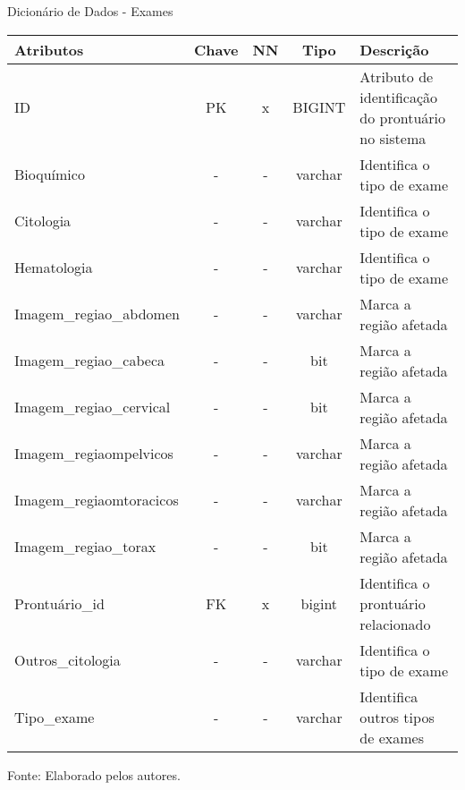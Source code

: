 \documentclass[
    12pt,               %
    openright,          %
    oneside,
    a4paper,            %
    BIBLATEX,           %
    TODO,               %
    english,            %
    brazil              %
    ]{ifsp-spo-inf-ctds}
\begin{document}
\begin{center}
                \begin{quadro}[H]
              
                  \caption{Dicionário de Dados - Exames}
                  \begin{tabulary}{1.0\textwidth}{|p{11em}|c|c|c|p{17em}|}
                  \hline
                  Atributos & Chave & NN & Tipo & Descrição\\
                  \hline
                  ID & PK & x & BIGINT & Atributo de identificação do prontuário no sistema\\
                  \hline
		  Bioquímico & - & - & varchar & Identifica o tipo de exame\\
		  \hline
		  Citologia & - & - & varchar & Identifica o tipo de exame \\
		  \hline
		  Hematologia & - & - & varchar & Identifica o tipo de exame\\
		  \hline  
                  Imagem\_regiao\_abdomen & - & - & varchar & Marca a região afetada\\
                  \hline
                  Imagem\_regiao\_cabeca & - & - & bit & Marca a região afetada\\
                  \hline
		  Imagem\_regiao\_cervical & - & - & bit & Marca a região afetada\\
                  \hline
                  Imagem\_regiaompelvicos & - & - & varchar & Marca a região afetada\\
                  \hline
                  Imagem\_regiaomtoracicos & - & - & varchar & Marca a região afetada\\
                  \hline
                  Imagem\_regiao\_torax & - & - & bit & Marca a região afetada\\
                  \hline
		  Prontuário\_id & FK & x & bigint & Identifica o prontuário relacionado \\
                  \hline 
		  Outros\_citologia & - & - & varchar & Identifica o tipo de exame\\
		  \hline
		  Tipo\_exame & - & - & varchar & Identifica outros tipos de exames\\
		  \hline  
                  
                  \end{tabulary}
                  \label{qd: md-exame}
                  \centering
                  \footnotesize Fonte: Elaborado pelos autores.
                \end{quadro}
            \end{center} 
\end{document}
